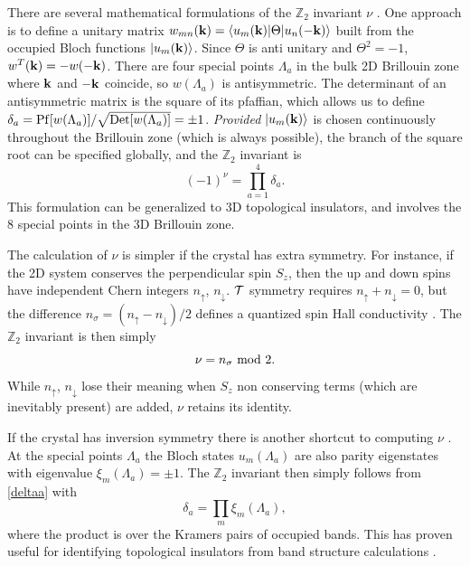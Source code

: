 \documentclass[twocolumn,floatfix,showpacs,rmp,aps]{revtex4}
\begin{document}
There are several mathematical formulations of the $\mathbb{Z}_2$ invariant $\nu$
\cite{kanemele05b,fukane06,moorebalents07,fukane07,fukui07,fukui08,qihugheszhang08,roy09a,wang09}.  One
approach \cite{fukane06} is to define a unitary matrix
$w_{mn}({\bf k}) = \langle u_m({\bf k})|\Theta|u_n(-{\bf k})\rangle$
built from the occupied Bloch functions
$|u_m({\bf k})\rangle$.  Since $\Theta$ is anti unitary
and $\Theta^2=-1$, $w^T({\bf k}) = - w(-{\bf k})$.  There are four
special points $\Lambda_a$ in the bulk 2D Brillouin zone where ${\bf k}$ and
$-{\bf k}$ coincide, so $w(\Lambda_a)$ is
antisymmetric.  The determinant of an antisymmetric matrix is the square of
its pfaffian, which allows us to define
$\delta_a = {\rm Pf}[w(\Lambda_a)]/\sqrt{{\rm Det}[w(\Lambda_a)]} = \pm 1$.
{\it Provided} $|u_m({\bf k})\rangle$ is chosen continuously
throughout the Brillouin zone (which is always possible), the branch
of the square root can be specified globally, and the $\mathbb{Z}_2$
invariant is
\begin{equation}
(-1)^\nu = \prod_{a=1}^4 \delta_a.
\label{deltaa}
\end{equation}
This formulation can be
generalized to 3D topological insulators, and involves
the 8 special points in the 3D Brillouin zone.

The calculation of $\nu$ is simpler
if the crystal has extra symmetry.  For instance, if the 2D system
conserves the perpendicular spin $S_z$, then the
up and down spins have independent
Chern integers $n_\uparrow$, $n_\downarrow$.
${\cal T}$ symmetry requires $n_\uparrow+n_\downarrow = 0$, but
the difference $n_\sigma = (n_\uparrow-n_\downarrow)/2$ defines a quantized spin
Hall conductivity \cite{sheng06}.  The $\mathbb{Z}_2$ invariant is then simply
\begin{equation}
\nu = n_\sigma \ {\rm mod} \ 2.
\end{equation}
While $n_\uparrow$, $n_\downarrow$ lose
their meaning when $S_z$ non conserving terms (which
are inevitably present) are added, $\nu$ retains its identity.

If the crystal has inversion symmetry there is another shortcut to
computing $\nu$ \cite{fukane07}.  At the special points $\Lambda_a$
the Bloch states $u_m(\Lambda_a)$ are also parity eigenstates with eigenvalue
$\xi_m(\Lambda_a)=\pm 1$.  The $\mathbb{Z}_2$ invariant then simply
follows from \eqref{deltaa} with
\begin{equation}
\delta_a = \prod_{m} \xi_m(\Lambda_a),
\label{parityz2}
\end{equation}
where the product is over the Kramers pairs of occupied bands.
This has proven useful for identifying
topological insulators from band structure calculations
\cite{fukane07,teofukane08,zhangh09,pesin10,guo09}.
\end{document}
